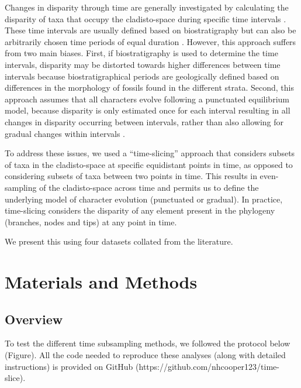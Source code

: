 \documentclass[12pt,a4paper]{article}
\begin{document}
Changes in disparity through time are generally investigated by calculating the disparity of taxa that occupy the cladisto-space during specific time intervals \citep[e.g][]{cisneros2010,prentice2011,Hughes20082013,hopkinsdecoupling2013,bentonmodels2014,bensonfaunal2014}.
These time intervals are usually defined based on biostratigraphy \citep[e.g.][]{cisneros2010,prentice2011,Hughes20082013,bentonmodels2014} but can also be arbitrarily chosen time periods of equal duration \citep{Butler2012,hopkinsdecoupling2013,bensonfaunal2014}.
However, this approach suffers from two main biases. 
First, if biostratigraphy is used to determine the time intervals, disparity may be distorted towards higher differences between time intervals because biostratigraphical periods are geologically defined based on differences in the morphology of fossils found in the different strata.
Second, this approach assumes that all characters evolve following a punctuated equilibrium model, because disparity is only estimated once for each interval resulting in all changes in disparity occurring between intervals, rather than also allowing for gradual changes within intervals \citep{Hunt21042015}.

To address these issues, we used a ``time-slicing'' approach that considers subsets of taxa in the cladisto-space at specific equidistant points in time, as opposed to considering subsets of taxa between two points in time.
This results in even-sampling of the cladisto-space across time and permits us to define the underlying model of character evolution (punctuated or gradual).  
In practice, time-slicing considers the disparity of any element present in the phylogeny (branches, nodes and tips) at any point in time.

We present this using four datasets collated from the literature.

\section{Materials and Methods}
\subsection{Overview}
\label{overview-section}
To test the different time subsampling methods, we followed the protocol below (Figure). 
All the code needed to reproduce these analyses (along with detailed instructions) is provided on GitHub (https://github.com/nhcooper123/time-slice). %
\end{document}
